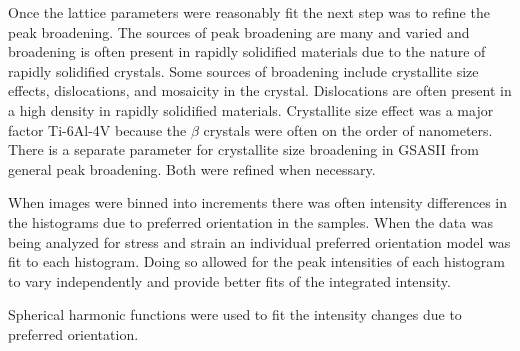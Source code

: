 Once the lattice parameters were reasonably fit the next step was to refine the peak broadening. The sources of peak broadening are many and varied and broadening is often present in rapidly solidified materials due to the nature of rapidly solidified crystals. Some sources of broadening include crystallite size effects, dislocations, and mosaicity in the crystal. Dislocations are often present in a high density in rapidly solidified materials. Crystallite size effect was a major factor Ti-6Al-4V because the $\beta$ crystals were often on the order of nanometers. There is a separate parameter for crystallite size broadening in GSASII from general peak broadening. Both were refined when necessary.

When images were binned into increments there was often intensity differences in the histograms due to preferred orientation in the samples. When the data was being analyzed for stress and strain an individual preferred orientation model was fit to each histogram. Doing so allowed for the peak intensities of each histogram to vary independently and provide better fits of the integrated intensity. 

Spherical harmonic functions were used to fit the intensity changes due to preferred orientation. 



